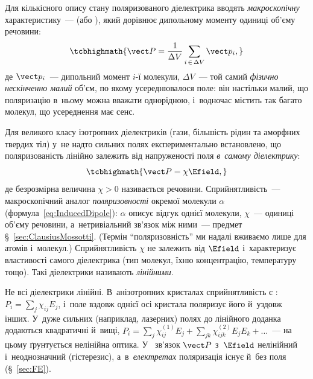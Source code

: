 Для кількісного опису стану поляризованого діелектрика вводять \emph{макроскопічну}
характеристику~---  (або ), який дорівнює
дипольному моменту одиниці об'єму речовини:
\begin{equation}\label{eq:Pdef}
	\tcbhighmath{
		\vect P = \frac1{\Delta V}\sum\limits_{i\,\in\,\Delta V} \vect p_i,
	}
\end{equation}
де $\vect p_i$~--- дипольний момент $i$-ї молекули, $\Delta V$~--- той самий \emph{фізично нескінченно малий} об'єм, по якому усереднювалося поле:
він настільки малий, що поляризацію в~ньому можна вважати однорідною, і~водночас містить
так багато молекул, що усереднення має сенс.

Для великого класу ізотропних діелектриків (гази, більшість рідин та аморфних твердих тіл)
у~не надто сильних полях експериментально встановлено, що поляризованість лінійно залежить від напруженості поля
\emph{в~самому діелектрику}:
\begin{equation}\label{eq:PlinearE}
	\tcbhighmath{
		\vect P = \chi \Efield,
	}
\end{equation}
де безрозмірна величина $\chi > 0$ називається  речовини. Сприйнятливість~---
макроскопічний аналог \emph{поляризовності} окремої молекули $\alpha$
(формула~\eqref{eq:InducedDipole}): $\alpha$ описує відгук однієї молекули, $\chi$~---
одиниці об'єму речовини, а~нетривіальний зв'язок між ними~--- предмет
\S~\ref{sec:ClausiusMossotti}. (Термін \enquote{поляризовність} ми надалі вживаємо лише
для атомів і~молекул.) Сприйнятливість $\chi$ не залежить від $\Efield$ і~характеризує властивості
самого діелектрика (тип молекул, їхню концентрацію, температуру тощо). Такі діелектрики
називають \emph{лінійними}.

Не всі діелектрики лінійні. В~анізотропних кристалах сприйнятливість є :
$P_i = \sum_j \chi_{ij}E_j$, і~поле вздовж однієї осі кристала поляризує його й~уздовж
інших. У~дуже сильних (наприклад, лазерних) полях до лінійного доданка додаються квадратичні
й~вищі, $P_i = \sum_j \chi^{(1)}_{ij}E_j + \sum_{jk}\chi^{(2)}_{ijk}E_jE_k + \ldots$~--- на
цьому ґрунтується нелінійна оптика. У~ зв'язок $\vect P$ з~$\Efield$
нелінійний і~неоднозначний (гістерезис), а~в~\emph{електретах} поляризація існує й~без поля
(\S~\ref{sec:FE}).


